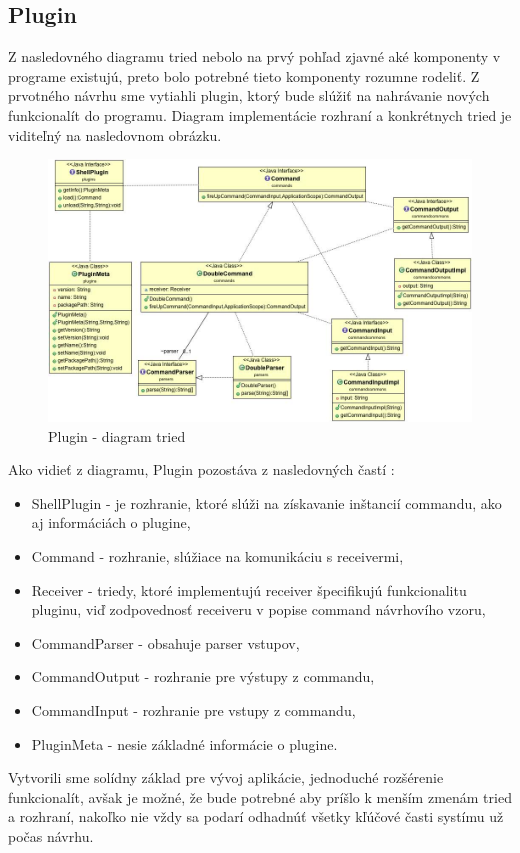 \subsection{Plugin}
\indent Z nasledovného diagramu tried nebolo na prvý pohľad zjavné aké komponenty v programe existujú, preto bolo potrebné tieto komponenty rozumne rodeliť. Z prvotného návrhu sme vytiahli plugin, ktorý bude slúžiť na nahrávanie nových funkcionalít do programu.  Diagram implementácie rozhraní a konkrétnych tried  je viditeľný na nasledovnom obrázku. 
\newpage
 \begin{figure}[H]
	\centering
	\includegraphics[width=\linewidth]{img/plugin_class.jpg}
	\caption{Plugin - diagram tried}
	\label{fig:test}
\end{figure}

\indent Ako vidieť z diagramu, Plugin pozostáva z nasledovných častí :
\begin{itemize}
	\item ShellPlugin - je rozhranie, ktoré slúži na získavanie inštancií commandu, ako aj informáciách o plugine, 
	\item Command - rozhranie, slúžiace na komunikáciu s receivermi,
	\item Receiver - triedy, ktoré implementujú receiver špecifikujú funkcionalitu pluginu, viď zodpovednosť receiveru v popise command návrhovího vzoru,
	\item CommandParser - obsahuje parser vstupov,
	\item CommandOutput - rozhranie pre výstupy z commandu,
	\item CommandInput - rozhranie pre vstupy z commandu,
	\item  PluginMeta - nesie základné informácie o plugine.
\end{itemize}
Vytvorili sme solídny základ pre vývoj aplikácie, jednoduché rozšérenie funkcionalít, avšak je možné, že bude potrebné aby príšlo k menším zmenám tried a rozhraní, nakoľko nie vždy sa podarí odhadnúť  všetky kľúčové časti systímu už počas návrhu.

